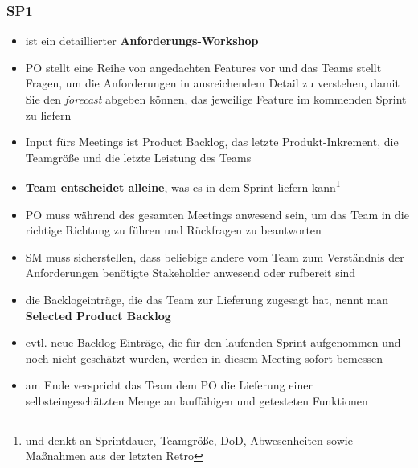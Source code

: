 \subsubsection{SP1}
\begin{itemize}
  \item ist ein detaillierter \textbf{Anforderungs-Workshop}
  \item PO stellt eine Reihe von angedachten Features vor und das Teams stellt Fragen, um die
    Anforderungen in ausreichendem Detail zu verstehen, damit Sie den \textit{forecast} abgeben
    können, das jeweilige Feature im kommenden Sprint zu liefern
  \item Input fürs Meetings ist Product Backlog, das letzte Produkt-Inkrement, die Teamgröße
    und die letzte Leistung des Teams
  \item \textbf{Team entscheidet alleine}, was es in dem Sprint liefern kann\footnote{und denkt an
      Sprintdauer, Teamgröße, DoD, Abwesenheiten sowie Maßnahmen aus der letzten Retro}
  \item PO muss während des gesamten Meetings anwesend sein, um das Team in die richtige Richtung
    zu führen und Rückfragen zu beantworten
  \item SM muss sicherstellen, dass beliebige andere vom Team zum Verständnis der
    Anforderungen benötigte Stakeholder anwesend oder rufbereit sind
  \item die Backlogeinträge, die das Team zur Lieferung zugesagt hat, nennt man
    \textbf{Selected Product Backlog}
  \item evtl. neue Backlog-Einträge, die für den laufenden Sprint aufgenommen und noch
    nicht geschätzt wurden, werden in diesem Meeting sofort bemessen
  \item am Ende verspricht das Team dem PO die Lieferung einer selbsteingeschätzten
    Menge an lauffähigen und getesteten Funktionen
\end{itemize}


